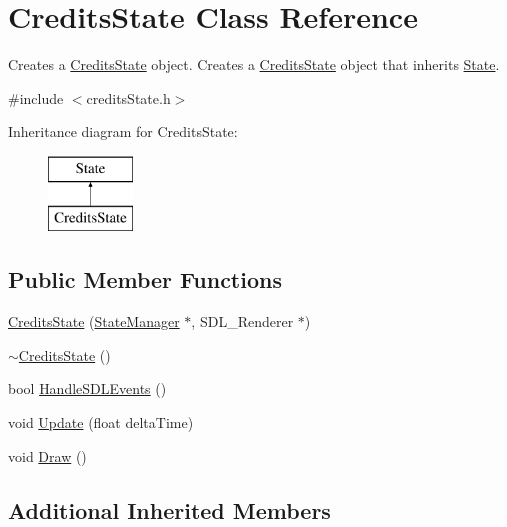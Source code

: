 \hypertarget{class_credits_state}{\section{Credits\+State Class Reference}
\label{class_credits_state}
}


Creates a \hyperlink{class_credits_state}{Credits\+State} object. Creates a \hyperlink{class_credits_state}{Credits\+State} object that inherits \hyperlink{class_state}{State}.  




{\ttfamily \#include $<$credits\+State.\+h$>$}

Inheritance diagram for Credits\+State\+:\begin{figure}[H]
\begin{center}
\leavevmode
\includegraphics[height=2.000000cm]{class_credits_state}
\end{center}
\end{figure}
\subsection*{Public Member Functions}
\begin{DoxyCompactItemize}
\item 
\hyperlink{class_credits_state_a0904712a229318e1b8e43d1c6bb27b7c}{Credits\+State} (\hyperlink{class_state_manager}{State\+Manager} $\ast$, S\+D\+L\+\_\+\+Renderer $\ast$)
\item 
\hyperlink{class_credits_state_abf1cbbd68bbbbf05eae5ab4721f2233a}{$\sim$\+Credits\+State} ()
\item 
bool \hyperlink{class_credits_state_a952d9a50d529f1ba4d883b4a37f558d4}{Handle\+S\+D\+L\+Events} ()
\item 
void \hyperlink{class_credits_state_ab9ad90f4b1c6ddab6ff1234a92c9aec1}{Update} (float delta\+Time)
\item 
void \hyperlink{class_credits_state_a4027aad0c48b505a74faef47470622a1}{Draw} ()
\end{DoxyCompactItemize}
\subsection*{Additional Inherited Members}


